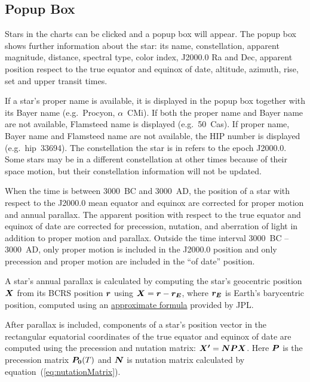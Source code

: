 \documentclass[12pt]{article}
\newcommand{\ve}[1]{\mbox{\boldmath $#1$}}
\begin{document}
\subsection{Popup Box} 
\label{sec:starsPopup}

Stars in the charts can be clicked and a popup box 
will appear. The popup box shows further information about the star: its name, 
constellation, 
apparent magnitude, distance, spectral type, color index, J2000.0 Ra and Dec, 
apparent position respect to the true equator and equinox of date, altitude, 
azimuth, rise, set and upper transit times. 

If a star's proper name is available, it is displayed in the 
popup box together with its Bayer name (e.g.\ Procyon, $\alpha$~CMi). 
If both the proper name and Bayer name are not available, Flamsteed 
name is displayed (e.g.\ 50~Cas). If proper name, Bayer name and 
Flamsteed name are not available, the HIP number is displayed (e.g.\ hip~33694). 
The constellation the star is in refers to the epoch J2000.0. Some stars 
may be in a different constellation at other times because of their space motion, 
but their constellation information will not be updated.  

When the time is between 3000~BC and 3000~AD, the position of a star 
with respect to the J2000.0 mean equator and equinox are corrected for 
proper motion and annual parallax. The apparent position with respect 
to the true equator and equinox of date are corrected for precession, 
nutation, and aberration of light in addition to proper motion and 
parallax. Outside the time interval 3000~BC -- 3000~AD, only proper 
motion is included in the J2000.0 position and only precession and 
proper motion are included in the ``of date'' position. 

A star's annual parallax is calculated by computing the star's geocentric 
position $\ve{X}$ from its BCRS position $\ve{r}$ using $\ve{X}=\ve{r}-\ve{r_E}$, 
where $\ve{r_E}$ is Earth's barycentric position, computed using 
an \href{https://ssd.jpl.nasa.gov/?planet_pos}{approximate formula} provided by JPL. 

After parallax is included, components of a star's position vector in the 
rectangular equatorial coordinates of the true equator and equinox 
of date are computed using the precession and nutation matrix: 
$\ve{X'}=\ve{NPX}$. Here $\ve{P}$ is the precession matrix $\ve{P_0}(T)$ and 
$\ve{N}$ is nutation matrix calculated by equation~(\ref{eq:nutationMatrix}).
\end{document}

